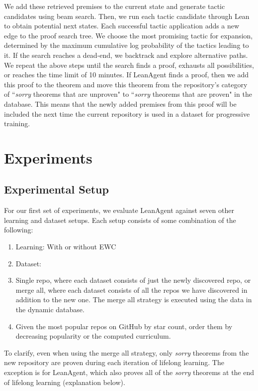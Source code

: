 \documentclass{article} %
\begin{document}
We add these retrieved premises to the current state and generate tactic candidates using beam search. Then, we run each tactic candidate through Lean to obtain potential next states. Each successful tactic application adds a new edge to the proof search tree. We choose the most promising tactic for expansion, determined by the maximum cumulative log probability of the tactics leading to it. If the search reaches a dead-end, we backtrack and explore alternative paths. We repeat the above steps until the search finds a proof, exhausts all possibilities, or reaches the time limit of 10 minutes. If LeanAgent finds a proof, then we add this proof to the theorem and move this theorem from the repository's category of ``\textit{sorry} theorems that are unproven" to ``\textit{sorry} theorems that are proven" in the database. This means that the newly added premises from this proof will be included the next time the current repository is used in a dataset for progressive training.


\section{Experiments}

\subsection{Experimental Setup}

For our first set of experiments, we evaluate LeanAgent against seven other learning and dataset setups. Each setup consists of some combination of the following:
\begin{enumerate}
    \item Learning: With or without EWC
    \item Dataset:
        \item Single repo, where each dataset consists of just the newly discovered repo, or merge all, where each dataset consists of all the repos we have discovered in addition to the new one. The merge all strategy is executed using the data in the dynamic database.
        \item Given the most popular repos on GitHub by star count, order them by decreasing popularity or the computed curriculum.
\end{enumerate}

To clarify, even when using the merge all strategy, only \textit{sorry} theorems from the new repository are proven during each iteration of lifelong learning. The exception is for LeanAgent, which also proves all of the \textit{sorry} theorems at the end of lifelong learning (explanation below).
\end{document}
